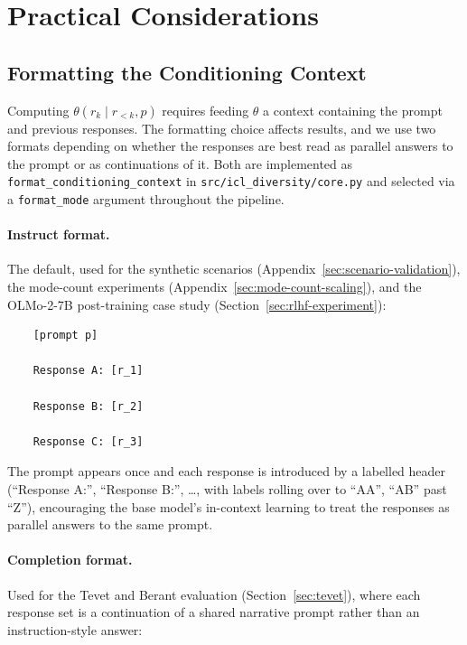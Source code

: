 \section{Practical Considerations}\label{sec:practical}

\subsection{Formatting the Conditioning Context}\label{sec:formatting}

Computing $\theta(r_k \mid r_{<k}, p)$ requires feeding $\theta$ a context containing the prompt and previous responses.
The formatting choice affects results, and we use two formats depending on whether the responses are best read as parallel answers to the prompt or as continuations of it.
Both are implemented as \texttt{format\_conditioning\_context} in \texttt{src/icl\_diversity/core.py} and selected via a \texttt{format\_mode} argument throughout the pipeline.

\paragraph{Instruct format.} The default, used for the synthetic scenarios (Appendix~\ref{sec:scenario-validation}), the mode-count experiments (Appendix~\ref{sec:mode-count-scaling}), and the OLMo-2-7B post-training case study (Section~\ref{sec:rlhf-experiment}):

\begin{verbatim}
    [prompt p]

    Response A: [r_1]

    Response B: [r_2]

    Response C: [r_3]
\end{verbatim}

The prompt appears once and each response is introduced by a labelled header (``Response A:'', ``Response B:'', \ldots, with labels rolling over to ``AA'', ``AB'' past ``Z''), encouraging the base model's in-context learning to treat the responses as parallel answers to the same prompt.

\paragraph{Completion format.} Used for the Tevet and Berant evaluation (Section~\ref{sec:tevet}), where each response set is a continuation of a shared narrative prompt rather than an instruction-style answer:

